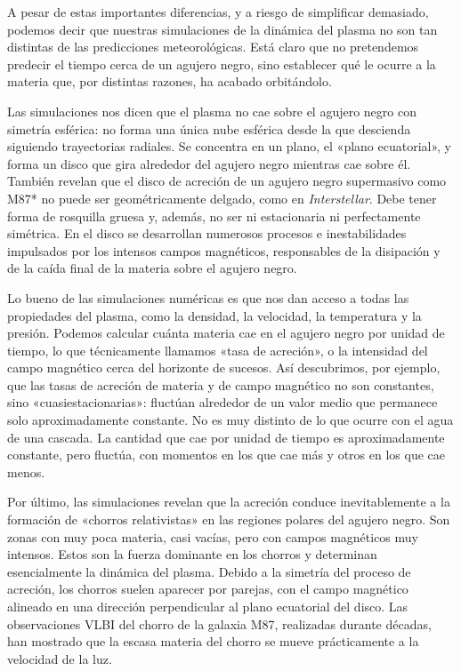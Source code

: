 A pesar de estas importantes diferencias, y a riesgo de simplificar demasiado, podemos decir que nuestras simulaciones de la dinámica del plasma no son tan distintas de las predicciones meteorológicas. Está claro que no pretendemos predecir el tiempo cerca de un agujero negro, sino establecer qué le ocurre a la materia que, por distintas razones, ha acabado orbitándolo.

Las simulaciones nos dicen que el plasma no cae sobre el agujero negro con simetría esférica: no forma una única nube esférica desde la que descienda siguiendo trayectorias radiales. Se concentra en un plano, el «plano ecuatorial», y forma un disco que gira alrededor del agujero negro mientras cae sobre él. También revelan que el disco de acreción de un agujero negro supermasivo como M87* no puede ser geométricamente delgado, como en \emph{Interstellar}. Debe tener forma de rosquilla gruesa y, además, no ser ni estacionaria ni perfectamente simétrica. En el disco se desarrollan numerosos procesos e inestabilidades impulsados por los intensos campos magnéticos, responsables de la disipación y de la caída final de la materia sobre el agujero negro.

Lo bueno de las simulaciones numéricas es que nos dan acceso a todas las propiedades del plasma, como la densidad, la velocidad, la temperatura y la presión. Podemos calcular cuánta materia cae en el agujero negro por unidad de tiempo, lo que técnicamente llamamos «tasa de acreción», o la intensidad del campo magnético cerca del horizonte de sucesos. Así descubrimos, por ejemplo, que las tasas de acreción de materia y de campo magnético no son constantes, sino «cuasiestacionarias»: fluctúan alrededor de un valor medio que permanece solo aproximadamente constante. No es muy distinto de lo que ocurre con el agua de una cascada. La cantidad que cae por unidad de tiempo es aproximadamente constante, pero fluctúa, con momentos en los que cae más y otros en los que cae menos.

Por último, las simulaciones revelan que la acreción conduce inevitablemente a la formación de «chorros relativistas» en las regiones polares del agujero negro. Son zonas con muy poca materia, casi vacías, pero con campos magnéticos muy intensos. Estos son la fuerza dominante en los chorros y determinan esencialmente la dinámica del plasma. Debido a la simetría del proceso de acreción, los chorros suelen aparecer por parejas, con el campo magnético alineado en una dirección perpendicular al plano ecuatorial del disco. Las observaciones VLBI del chorro de la galaxia M87, realizadas durante décadas, han mostrado que la escasa materia del chorro se mueve prácticamente a la velocidad de la luz.

